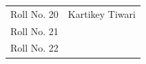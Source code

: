 \begin{tabular}{@{}ll@{}}
Roll No. 20 & Kartikey Tiwari \\
Roll No. 21 & \\
Roll No. 22 & \\
\end{tabular}
